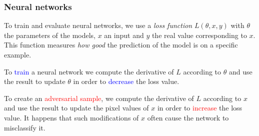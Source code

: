 \documentclass[9pt]{beamer}
\begin{document}












\begin{frame}
  \frametitle{Neural networks}

  To train and evaluate neural networks, we use a \emph{loss function}
  $L(\theta, x, y)$ with $\theta$ the parameters of the models, $x$ an input and
  $y$ the real value corresponding to $x$. This function measures
  \emph{how good} the prediction of the model is on a specific
  example.

  \bigskip

  \pause

  To \textcolor{blue}{train} a neural network we compute the
  derivative of $L$ according to $\theta$ and use the result to update $\theta$
  in order to \textcolor{blue}{decrease} the loss value.

  \bigskip

  \pause

  To create an \textcolor{red}{adversarial sample}, we compute the
  derivative of $L$ according to $x$ and use the result to update the
  pixel values of $x$ in order to \textcolor{red}{increase} the loss
  value. It happens that such modifications of $x$ often cause the
  network to misclassify it.
\end{frame}
\end{document}
